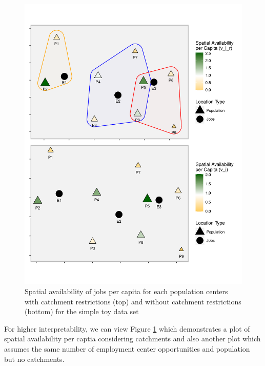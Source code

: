 \documentclass[]{elsarticle} %
\begin{document}
\begin{figure}
\includegraphics[width=1\linewidth]{Spatial-Availability_files/figure-latex/toy-example-availability-jobs-per-capita-1} \caption{\label{fig:toy-example-availability-jobs-per-capita} Spatial availability of jobs per capita for each population centers with catchment restrictions (top) and without catchment restrictions (bottom) for the simple toy data set}\label{fig:toy-example-availability-jobs-per-capita}
\end{figure}

For higher interpretability, we can view Figure
\ref{fig:toy-example-availability-jobs-per-capita} which demonstrates a
plot of spatial availability per captia considering catchments and also
another plot which assumes the same number of employment center
opportunities and population but no catchments.
\end{document}
